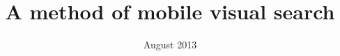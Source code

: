 \documentclass[12pt,a4paper]{article}
\begin{document}
\title{A method of mobile visual search}
\date{August 2013}

\maketitle
\tableofcontents





\clearpage
{}

\end{document}
